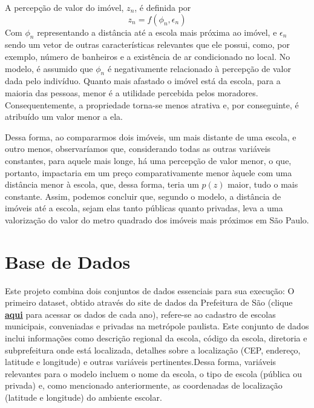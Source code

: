 A percepção de valor do imóvel, \(z_n\), é definida por
\begin{equation}
    z_n=f(\phi_n,\epsilon_n)
\end{equation}
Com  \(\phi_n\) representando a distância até a escola mais próxima ao imóvel, e \(\epsilon_n\) sendo um vetor de outras características relevantes que ele possui, como, por exemplo, número de banheiros e a existência de ar condicionado no local. No modelo, é assumido que \(\phi_n\) é negativamente relacionado à percepção de valor dada pelo indivíduo. Quanto mais afastado o imóvel está da escola, para a maioria das pessoas, menor é a utilidade percebida pelos moradores. Consequentemente, a propriedade torna-se menos atrativa e, por conseguinte, é atribuído um valor menor a ela.

Dessa forma, ao compararmos dois imóveis, um mais distante de uma escola, e outro menos, observaríamos que, considerando todas as outras variáveis constantes, para aquele mais longe, há uma percepção de valor menor, o que, portanto, impactaria em um preço comparativamente menor àquele com uma distância menor à escola, que, dessa forma, teria um $p(z)$ maior, tudo o mais constante. Assim, podemos concluir que, segundo o modelo, a distância de imóveis até a escola, sejam elas tanto públicas quanto privadas, leva a uma valorização do valor do metro quadrado dos imóveis mais próximos em São Paulo.


\section{Base de Dados}

Este projeto combina dois conjuntos de dados essenciais para sua execução: O primeiro dataset, obtido através do site de dados da Prefeitura de São \textcite{DadosPrefeitura} (clique \href{http://dados.prefeitura.sp.gov.br/nl/dataset/cadastro-de-escolas-municipais-conveniadas-e-privadas}{\textbf{aqui}} para acessar os dados de cada ano), refere-se ao cadastro de escolas municipais, conveniadas e privadas na metrópole paulista. Este conjunto de dados inclui informações como descrição regional da escola, código da escola, diretoria e subprefeitura onde está localizada, detalhes sobre a localização (CEP, endereço, latitude e longitude) e outras variáveis pertinentes.Dessa forma, variáveis relevantes para o modelo incluem o nome da escola, o tipo de escola (pública ou privada) e, como mencionado anteriormente, as coordenadas de localização (latitude e longitude) do ambiente escolar.

